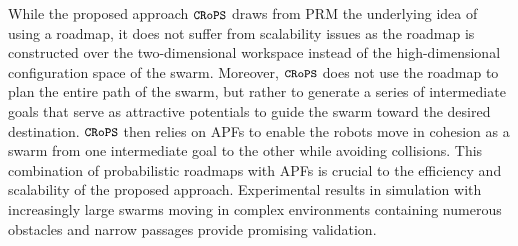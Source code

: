 \documentclass{llncs}
\newcommand{\Acronym}[1]{\ensuremath{{\small{\texttt{#1}}}}}
\newcommand{\Name}{\Acronym{CRoPS}}
\begin{document}
While the proposed approach $\Name$ draws from PRM the underlying idea
of using a roadmap, it does not suffer from scalability issues as the
roadmap is constructed over the two-dimensional workspace instead of
the high-dimensional configuration space of the swarm. Moreover,
$\Name$ does not use the roadmap to plan the entire path of the swarm,
but rather to generate a series of intermediate goals that serve as
attractive potentials to guide the swarm toward the desired
destination. $\Name$ then relies on APFs to enable the robots move in
cohesion as a swarm from one intermediate goal to the other while
avoiding collisions. This combination of probabilistic roadmaps with
APFs is crucial to the efficiency and scalability of the proposed
approach. Experimental results in simulation with increasingly large
swarms moving in complex environments containing numerous obstacles
and narrow passages provide promising validation.

%



\end{document}
